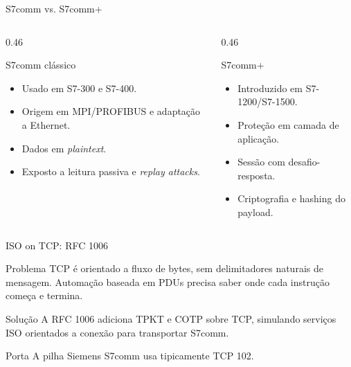 \documentclass[10pt, aspectratio=169]{beamer}
\begin{document}
\begin{frame}{S7comm vs. S7comm+}
    \small
    \begin{columns}[T,totalwidth=\textwidth]
        \begin{column}{0.46\textwidth}
            \begin{block}{S7comm cl\'assico}
                \begin{itemize}
                    \item Usado em S7-300 e S7-400.
                    \item Origem em MPI/PROFIBUS e adapta\c{c}\~ao a Ethernet.
                    \item Dados em \textit{plaintext}.
                    \item Exposto a leitura passiva e \textit{replay attacks}.
                \end{itemize}
            \end{block}
        \end{column}
        \begin{column}{0.46\textwidth}
            \begin{block}{S7comm+}
                \begin{itemize}
                    \item Introduzido em S7-1200/S7-1500.
                    \item Prote\c{c}\~ao em camada de aplica\c{c}\~ao.
                    \item Sess\~ao com desafio-resposta.
                    \item Criptografia e hashing do payload.
                \end{itemize}
            \end{block}
        \end{column}
    \end{columns}
\end{frame}

\begin{frame}{ISO on TCP: RFC 1006}
    \small
    \begin{block}{Problema}
        TCP \'e orientado a fluxo de bytes, sem delimitadores naturais de mensagem. Automa\c{c}\~ao baseada em PDUs precisa saber onde cada instru\c{c}\~ao come\c{c}a e termina.
    \end{block}

    \begin{block}{Solu\c{c}\~ao}
        A RFC 1006 adiciona TPKT e COTP sobre TCP, simulando servi\c{c}os ISO orientados a conex\~ao para transportar S7comm.
    \end{block}

    \begin{block}{Porta}
        A pilha Siemens S7comm usa tipicamente \alert{TCP 102}.
    \end{block}
\end{frame}
\end{document}
